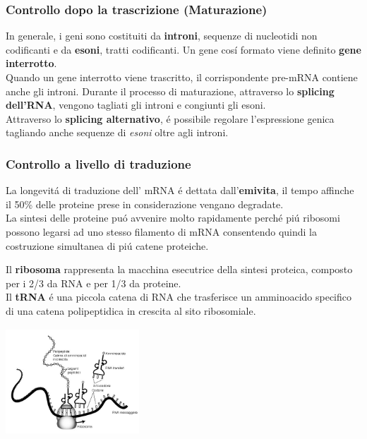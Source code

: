 \documentclass[hyperref={pdfpagelabels=false}]{beamer}
\begin{document}
\begin{frame}\frametitle{Controllo dopo la trascrizione (Maturazione)}
In generale, i geni sono costituiti da \textbf{introni}, sequenze di nucleotidi non codificanti e da \textbf{esoni}, tratti codificanti. Un gene cos\'i formato viene definito \textbf{gene interrotto}.\\
Quando un gene interrotto viene trascritto, il corrispondente pre-mRNA contiene anche gli introni. Durante il processo di maturazione, attraverso lo \textbf{splicing dell'RNA}, vengono tagliati gli introni e congiunti gli esoni.\\
Attraverso lo \textbf{splicing alternativo}, \'e possibile regolare l'espressione genica tagliando anche sequenze di \emph{esoni} oltre agli introni.
\end{frame}


\begin{frame}\frametitle{Controllo a livello di traduzione}
La longevit\'a di traduzione dell' mRNA \'e dettata dall'\textbf{emivita}, il tempo affinche il 50\% delle proteine prese in considerazione vengano degradate.\\
La sintesi delle proteine pu\'o avvenire molto rapidamente perch\'e pi\'u ribosomi possono legarsi ad uno stesso filamento di mRNA consentendo quindi la costruzione simultanea di pi\'u catene proteiche.
\begin{minipage}[c]{.5\textwidth}
Il \textbf{ribosoma} rappresenta la macchina esecutrice della sintesi proteica, composto per i 2/3 da RNA e per 1/3 da proteine.\\
Il \textbf{tRNA} \'e una piccola catena di RNA che trasferisce un amminoacido specifico di una catena polipeptidica in crescita al sito ribosomiale.
\end{minipage}
\begin{minipage}[c]{.45\textwidth}
\includegraphics[width=5cm,height=4cm]{traduzione.jpg}
\end{minipage}
\end{frame}
\end{document}
